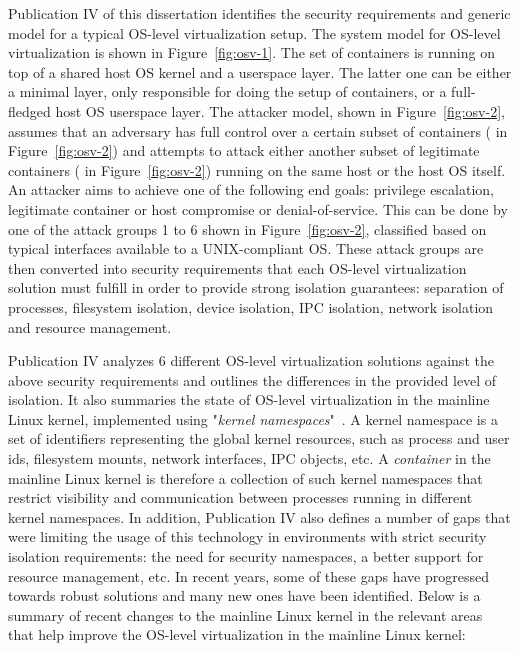 Publication IV of this dissertation identifies the security requirements and generic model for a typical OS-level virtualization setup.
The system model for OS-level virtualization is shown in Figure~\ref{fig:osv-1}. The set of containers  is running on top of a shared host OS kernel and a userspace layer. The latter one can be either a minimal layer, only responsible for doing the setup of containers, or a full-fledged host OS userspace layer. The attacker model, shown in Figure~\ref{fig:osv-2}, assumes that an adversary has full control over a certain subset of containers ( in Figure~\ref{fig:osv-2}) and attempts to attack either another subset of legitimate containers ( in Figure~\ref{fig:osv-2}) running on the same host or the host OS itself. An attacker aims to achieve one of the following end goals: privilege escalation, legitimate container or host compromise or denial-of-service. This can be done by one of the attack groups 1 to 6 shown in Figure~\ref{fig:osv-2}, classified based on typical interfaces available to a UNIX-compliant OS. These attack groups are then converted into security requirements that each OS-level virtualization solution must fulfill in order to provide strong isolation guarantees: separation of processes, filesystem isolation, device isolation, IPC isolation, network isolation and resource management.   

Publication IV analyzes 6 different OS-level virtualization solutions against the above security requirements and outlines the differences in the provided level of isolation. It also summaries the state of OS-level virtualization in the mainline Linux kernel, implemented using "\textit{kernel namespaces}"~\cite{biederman2006}. A kernel namespace is a set of identifiers representing the global kernel resources, such as process and user ids, filesystem mounts, network interfaces, IPC objects, etc. A \textit{container} in the mainline Linux kernel is therefore a collection of such kernel namespaces that restrict visibility and communication between processes running in different kernel namespaces. In addition, Publication IV also defines a number of gaps that were limiting the usage of this technology in environments with strict security isolation requirements: the need for security namespaces, a better support for resource management, etc. In recent years, some of these gaps have progressed towards robust solutions and many new ones have been identified. Below is a summary of recent changes to the mainline Linux kernel in the relevant areas that help improve the OS-level virtualization in the mainline Linux kernel:  

